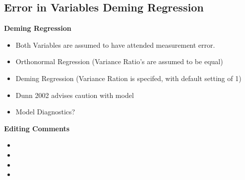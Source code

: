 \documentclass[compress]{beamer}        %
\begin{document}
\subsection{Error in Variables Deming Regression}
\begin{frame}


\textbf{Deming Regression}
\begin{itemize}
\item Both Variables are assumed to have attended measurement error.
\item Orthonormal Regression (Variance Ratio's are assumed to be equal)
\item Deming Regression (Variance Ration is specifed, with default setting of 1)
\item Dunn 2002 advises caution with model
\item Model Diagnostics?
\end{itemize}

\end{frame}
\begin{frame}
\textbf{Editing Comments}
\begin{itemize}
\item
\item
\item
\item 
\end{itemize}
\end{frame}
\end{document}

